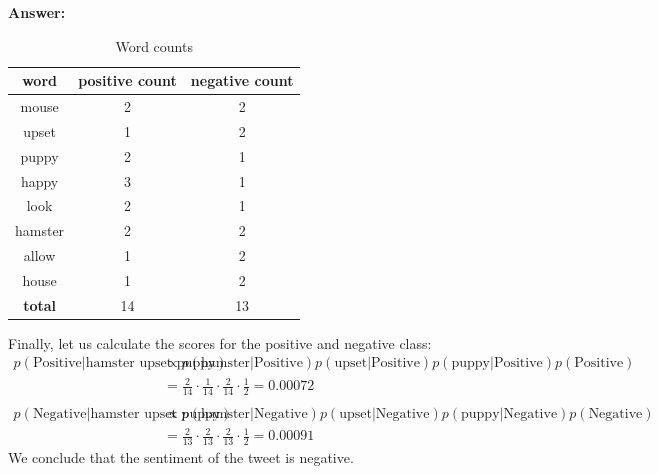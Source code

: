 \documentclass{article}
\newenvironment{QandA}{\begin{enumerate}[label=\arabic*.]}{\end{enumerate}}
\newenvironment{InnerQandA}{\begin{enumerate}[label=\roman*.]}{\end{enumerate}}
\newenvironment{answer}{\par\normalfont \textbf{Answer:}}{}
\newcommand{\g}{\vert}
\begin{document}
\begin{QandA}
\begin{InnerQandA}
\begin{answer}
        \begin{table}[h!]
        \centering
        \begin{tabular}{|c|c|c|}
        \hline
        \textbf{word}  & \textbf{positive count} & \textbf{negative count} \\ \hline
        mouse          & 2                       & 2                       \\ \hline
        upset          & 1                       & 2                       \\ \hline
        puppy          & 2                       & 1                       \\ \hline
        happy          & 3                       & 1                       \\ \hline
        look           & 2                       & 1                       \\ \hline
        hamster        & 2                       & 2                       \\ \hline
        allow          & 1                       & 2                       \\ \hline
        house          & 1                       & 2                       \\ \hline \hline
        \textbf{total} & 14                      & 13                      \\ \hline
        \end{tabular}
        \caption{Word counts}
        \label{tab:word-counts}
        \end{table}
        Finally, let us calculate the scores for the positive and negative class:
        \begin{align*}
            p(\text{Positive} \g \text{hamster upset puppy}) &\propto p(\text{hamster} \g \text{Positive}) p(\text{upset} \g \text{Positive}) p(\text{puppy} \g \text{Positive}) p(\text{Positive})\\
            &= \frac{2}{14} \cdot \frac{1}{14} \cdot \frac{2}{14} \cdot \frac{1}{2} = 0.00072\\\\
            p(\text{Negative} \g \text{hamster upset puppy}) &\propto p(\text{hamster} \g \text{Negative}) p(\text{upset} \g \text{Negative}) p(\text{puppy} \g \text{Negative}) p(\text{Negative})\\
            &= \frac{2}{13} \cdot \frac{2}{13} \cdot \frac{2}{13} \cdot \frac{1}{2} = 0.00091
        \end{align*}
        We conclude that the sentiment of the tweet is negative.


\end{answer}
\end{InnerQandA}
\end{QandA}
\end{document}
